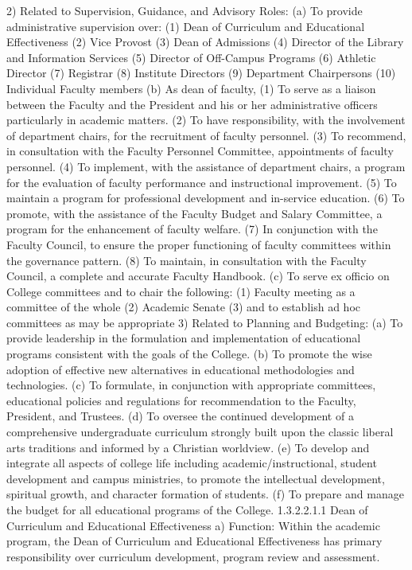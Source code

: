 \documentclass[letterpaper, 11pt]{article}
\begin{document}
2) Related to Supervision, Guidance, and Advisory Roles:
(a) To provide administrative supervision over:
(1) Dean of Curriculum and Educational Effectiveness 
(2) Vice Provost
(3) Dean of Admissions
(4) Director of the Library and Information Services
(5) Director of Off-Campus Programs
(6) Athletic Director
(7) Registrar
(8) Institute Directors
(9) Department Chairpersons
(10) Individual Faculty members
(b) As dean of faculty,
(1) To serve as a liaison between the Faculty and the President and his or her administrative officers particularly in academic matters.
(2) To have responsibility, with the involvement of department chairs, for the recruitment of faculty personnel.
(3) To recommend, in consultation with the Faculty Personnel Committee, appointments of faculty personnel.
(4) To implement, with the assistance of department chairs, a program for the evaluation of faculty performance and instructional improvement.
(5) To maintain a program for professional development and in-service education.
(6) To promote, with the assistance of the Faculty Budget and Salary Committee, a program for the enhancement of faculty welfare.
(7) In conjunction with the Faculty Council, to ensure the proper functioning of faculty committees within the governance pattern.
(8) To maintain, in consultation with the Faculty Council, a complete and accurate Faculty Handbook.
(c) To serve ex officio on College committees and to chair the following:
(1) Faculty meeting as a committee of the whole
(2) Academic Senate
(3) and to establish ad hoc committees as may be appropriate
3) Related to Planning and Budgeting:
(a) To provide leadership in the formulation and implementation of educational programs consistent with the goals of the College.
(b) To promote the wise adoption of effective new alternatives in educational methodologies and technologies.
(c) To formulate, in conjunction with appropriate committees, educational policies and regulations for recommendation to the Faculty, President, and Trustees.
(d) To oversee the continued development of a comprehensive undergraduate curriculum strongly built upon the classic liberal arts traditions and informed by a Christian worldview.
(e) To develop and integrate all aspects of college life including academic/instructional, student development and campus ministries, to promote the intellectual development, spiritual growth, and character formation of students.
(f) To prepare and manage the budget for all educational programs of the College.
1.3.2.2.1.1 Dean of Curriculum and Educational Effectiveness
a) Function:  Within the academic program, the Dean of Curriculum and Educational Effectiveness has primary responsibility over curriculum development, program review and assessment.
\end{document}
